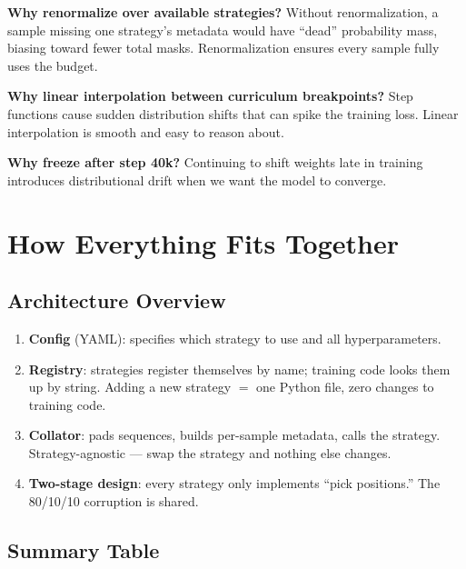 \documentclass[11pt]{article}
\begin{document}
\textbf{Why renormalize over available strategies?}
Without renormalization, a sample missing one strategy's metadata
would have ``dead'' probability mass, biasing toward fewer total
masks. Renormalization ensures every sample fully uses the budget.

\textbf{Why linear interpolation between curriculum breakpoints?}
Step functions cause sudden distribution shifts that can spike the
training loss. Linear interpolation is smooth and easy to reason
about.

\textbf{Why freeze after step 40k?}
Continuing to shift weights late in training introduces
distributional drift when we want the model to converge.

\section{How Everything Fits Together}

\subsection{Architecture Overview}
\begin{enumerate}
\item \textbf{Config} (YAML): specifies which strategy to use
      and all hyperparameters.
\item \textbf{Registry}: strategies register themselves by name;
      training code looks them up by string.
      Adding a new strategy $=$ one Python file, zero changes to
      training code.
\item \textbf{Collator}: pads sequences, builds per-sample
      metadata, calls the strategy. Strategy-agnostic --- swap
      the strategy and nothing else changes.
\item \textbf{Two-stage design}: every strategy only implements
      ``pick positions.'' The 80/10/10 corruption is shared.
\end{enumerate}

\subsection{Summary Table}
\end{document}
